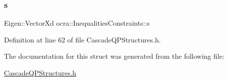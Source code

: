 \hypertarget{structocra_1_1InequalitiesConstraints_a26db4bbe606a537c1dedbc30a2ca8f36}{}\label{structocra_1_1InequalitiesConstraints_a26db4bbe606a537c1dedbc30a2ca8f36} 
\subsubsection{\texorpdfstring{s}{s}}
{\footnotesize\ttfamily Eigen\+::\+Vector\+Xd ocra\+::\+Inequalities\+Constraints\+::s}



Definition at line 62 of file Cascade\+Q\+P\+Structures.\+h.



The documentation for this struct was generated from the following file\+:\begin{DoxyCompactItemize}
\item 
\hyperlink{CascadeQPStructures_8h}{Cascade\+Q\+P\+Structures.\+h}\end{DoxyCompactItemize}
